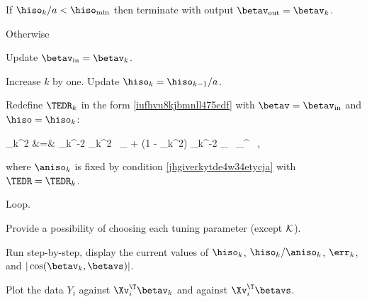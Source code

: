 \begin{mylist}
\item
If \( \hiso_{k}/a < \hiso_{\min} \) then terminate with output \( \betav_{\outp} = \betav_{k} \).

\item
Otherwise

\begin{mylist}
\item
Update \( \betav_{\init} = \betav_{k} \).

\item 
Increase \( k \) by one.
Update \( \hiso_{k} = \hiso_{k-1} / a \).

\item 
Redefine \( \TEDR_{k} \) in the form \eqref{iufhvu8kjbmnll475edf} with \( \betav = \betav_{\init} \) and \( \hiso = \hiso_{k} \):
\begin{EQA}[rcl]
	\TEDR_{k}^{2}
	&=&
	\hiso_{k}^{-2} \aniso_{k}^{2} \, \Id_{\dimd} 
	+ (1 - \aniso_{k}^{2}) \hiso_{k}^{-2} \betav_{\init} \, \betav_{\init}^{\T}
	\, ,
\label{iufhvu8kjbmnll475edfk}
\end{EQA}
where
\( \aniso_{k} \) is fixed by condition \eqref{jhgiverkytde4w34etycja}
with \( \TEDR = \TEDR_{k} \).
\end{mylist}

\item
Loop.
\end{mylist}


{\color{blue} 
\begin{mylist}
\item
Provide a possibility of choosing each tuning parameter (except \( \mathcal{K} \)).

\item
Run step-by-step, display the current values of \( \hiso_{k} \), \( \hiso_{k} /  \aniso_{k} \), \( \err_{k} \),
and \( |\cos(\betav_{k},\betavs)| \).



\item 
Plot the data \( Y_{i} \) against \( \Xv_{i}^{\T} \betav_{k} \) and against \( \Xv_{i}^{\T} \betavs \).

\end{mylist}
}

